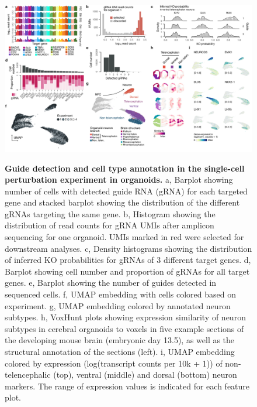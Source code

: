 \begin{figure}[h!]
    \centering
	\includegraphics[width=\textwidth]{figures/pando/Figure_S7}
    \label{fig:regS7}
    \caption{\textbf{Guide detection and cell type annotation in the single-cell perturbation experiment in organoids.} a, Barplot showing number of cells with detected guide RNA (gRNA) for each targeted gene and stacked barplot showing the distribution of the different gRNAs targeting the same gene. b, Histogram showing the distribution of read counts for gRNA UMIs after amplicon sequencing for one organoid. UMIs marked in red were selected for downstream analyses. c, Density histograms showing the distribution of inferred KO probabilities for gRNAs of 3 different target genes. d, Barplot showing cell number and proportion of gRNAs for all target genes. e, Barplot showing the number of guides detected in sequenced cells. f, UMAP embedding with cells colored based on experiment. g, UMAP embedding colored by annotated neuron subtypes. h, VoxHunt plots showing expression similarity of neuron subtypes in cerebral organoids to voxels in five example sections of the developing mouse brain (embryonic day 13.5), as well as the structural annotation of the sections (left). i, UMAP embedding colored by expression (log(transcript counts per 10k + 1)) of non-telencephalic (top), ventral (middle) and dorsal (bottom) neuron markers. The range of expression values is indicated for each feature plot.}
\end{figure}




